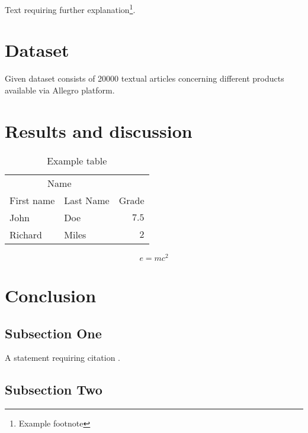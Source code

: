 \documentclass[twoside,twocolumn]{article}
\begin{document}
	Text requiring further explanation\footnote{Example footnote}.
	
	
	\section{Dataset}
	
	Given dataset consists of 20000 textual articles concerning different products available via Allegro platform.
	
	\section{Results and discussion}
	
	
	\begin{table}
		\caption{Example table}
		\centering
		\begin{tabular}{llr}
			\toprule
			\multicolumn{2}{c}{Name} \\
			\cmidrule(r){1-2}
			First name & Last Name & Grade \\
			\midrule
			John & Doe & $7.5$ \\
			Richard & Miles & $2$ \\
			\bottomrule
		\end{tabular}
	\end{table}
	
	\blindtext %
	
	\begin{equation}
	\label{eq:emc}
	e = mc^2
	\end{equation}
	
	\blindtext %
	
	
	\section{Conclusion}
	
	\subsection{Subsection One}
	
	A statement requiring citation \cite{Figueredo:2009dg}.
	\blindtext %
	
	\subsection{Subsection Two}
	
\end{document}
